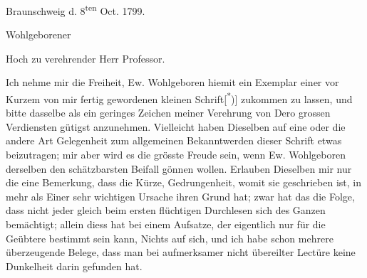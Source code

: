 \clearpage{}\NoSourceHead
{}
\begin{flushright}Braunschweig d. 8\textsuperscript{ten} Oct. 1799.\end{flushright}
\noindent\hspace*{.18\linewidth}Wohlgeborener\par
\noindent\hspace*{.18\linewidth}Hoch zu verehrender Herr Professor.

\indent Ich nehme mir die Freiheit, Ew. Wohlgeboren hiemit ein Exemplar einer vor Kurzem von mir fertig gewordenen kleinen Schrift[\textsuperscript{*})] zukommen zu lassen, und bitte dasselbe als ein geringes Zeichen meiner Verehrung von Dero grossen Verdiensten gütigst anzunehmen. Vielleicht haben Dieselben auf eine oder die andere Art Gelegenheit zum allgemeinen Bekanntwerden dieser Schrift etwas beizutragen; mir aber wird es die grösste Freude sein, wenn Ew. Wohlgeboren derselben den schätzbarsten Beifall gönnen wollen. Erlauben Dieselben mir nur die eine Bemerkung, dass die Kürze, Gedrungenheit, womit sie geschrieben ist, in mehr als Einer sehr wichtigen Ursache ihren Grund hat; zwar hat das die Folge, dass nicht jeder gleich beim ersten flüchtigen Durchlesen sich des Ganzen bemächtigt; allein diess hat bei einem Aufsatze, der eigentlich nur für die Geübtere bestimmt sein kann, Nichts auf sich, und ich habe schon mehrere überzeugende Belege, dass man bei aufmerksamer nicht übereilter Lectüre keine Dunkelheit darin gefunden hat.

